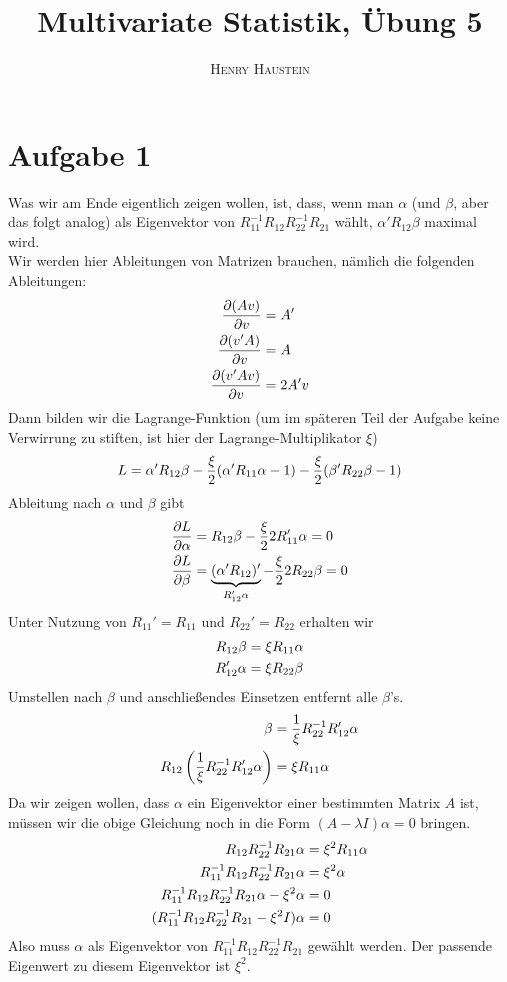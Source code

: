\documentclass{article}
\title{\textbf{Multivariate Statistik, Übung 5}}
\author{\textsc{Henry Haustein}}
\date{}
\begin{document}
	\maketitle
	
	\section*{Aufgabe 1}
	Was wir am Ende eigentlich zeigen wollen, ist, dass, wenn man $\alpha$ (und $\beta$, aber das folgt analog) als Eigenvektor von $R_{11}^{-1}R_{12}R_{22}^{-1}R_{21}$ wählt, $\alpha'R_{12}\beta$ maximal wird.\\
	Wir werden hier Ableitungen von Matrizen brauchen, nämlich die folgenden Ableitungen:
	\begin{align}
		\frac{\partial (Av)}{\partial v} &= A' \notag \\
		\frac{\partial (v'A)}{\partial v} &= A \notag \\
		\frac{\partial (v'Av)}{\partial v} &= 2A'v \notag
	\end{align}
	Dann bilden wir die Lagrange-Funktion (um im späteren Teil der Aufgabe keine Verwirrung zu stiften, ist hier der Lagrange-Multiplikator $\xi$)
	\begin{align}
		L = \alpha'R_{12}\beta - \frac{\xi}{2}(\alpha'R_{11}\alpha-1) - \frac{\xi}{2}(\beta'R_{22}\beta-1) \notag
	\end{align}
	Ableitung nach $\alpha$ und $\beta$ gibt
	\begin{align}
		\frac{\partial L}{\partial\alpha} &= R_{12}\beta - \frac{\xi}{2}2R_{11}'\alpha = 0 \notag \\
		\frac{\partial L}{\partial\beta} &= \underbrace{(\alpha'R_{12})'}_{R_{12}'\alpha} - \frac{\xi}{2}2R_{22}\beta = 0 \notag
	\end{align}
	Unter Nutzung von $R_{11}'=R_{11}$ und $R_{22}'=R_{22}$ erhalten wir
	\begin{align}
		R_{12}\beta &= \xi R_{11}\alpha \notag \\
		R_{12}'\alpha &= \xi R_{22}\beta \notag
	\end{align}
	Umstellen nach $\beta$ und anschließendes Einsetzen entfernt alle $\beta$'s.
	\begin{align}
		\beta &= \frac{1}{\xi}R_{22}^{-1}R_{12}'\alpha \notag \\
		R_{12}\left(\frac{1}{\xi}R_{22}^{-1}R_{12}'\alpha\right)&= \xi R_{11}\alpha \notag
	\end{align}
	Da wir zeigen wollen, dass $\alpha$ ein Eigenvektor einer bestimmten Matrix $A$ ist, müssen wir die obige Gleichung noch in die Form $(A-\lambda I)\alpha = 0$ bringen.
	\begin{align}
		R_{12}R_{22}^{-1}R_{21}\alpha &= \xi^2 R_{11}\alpha \notag \\
		R_{11}^{-1}R_{12}R_{22}^{-1}R_{21}\alpha &= \xi^2 \alpha \notag \\
		R_{11}^{-1}R_{12}R_{22}^{-1}R_{21}\alpha - \xi^2 \alpha &= 0 \notag \\
		(R_{11}^{-1}R_{12}R_{22}^{-1}R_{21} - \xi^2I)\alpha &= 0 \notag
	\end{align}
	Also muss $\alpha$ als Eigenvektor von $R_{11}^{-1}R_{12}R_{22}^{-1}R_{21}$ gewählt werden. Der passende Eigenwert zu diesem Eigenvektor ist $\xi^2$.
\end{document}
